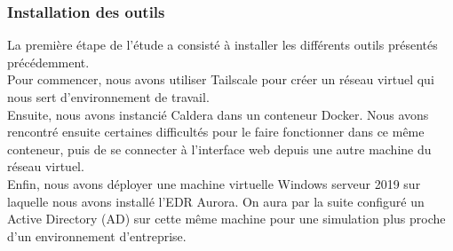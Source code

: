 \documentclass[12pt,letterpaper]{article}
\begin{document}
\subsubsection{Installation des outils}

La première étape de l'étude a consisté à installer les différents outils présentés précédemment. \\

Pour commencer, nous avons utiliser Tailscale pour créer un réseau virtuel qui nous sert d'environnement de travail. \\
Ensuite, nous avons instancié Caldera dans un conteneur Docker. Nous avons rencontré ensuite certaines difficultés pour le faire fonctionner dans ce même conteneur, puis de se connecter à l'interface web depuis une autre machine du réseau virtuel. \\
Enfin, nous avons déployer une machine virtuelle Windows serveur 2019 sur laquelle nous avons installé l'EDR Aurora. On aura par la suite configuré un Active Directory (AD) sur cette même machine pour une simulation plus proche d'un environnement d'entreprise.
\end{document}
